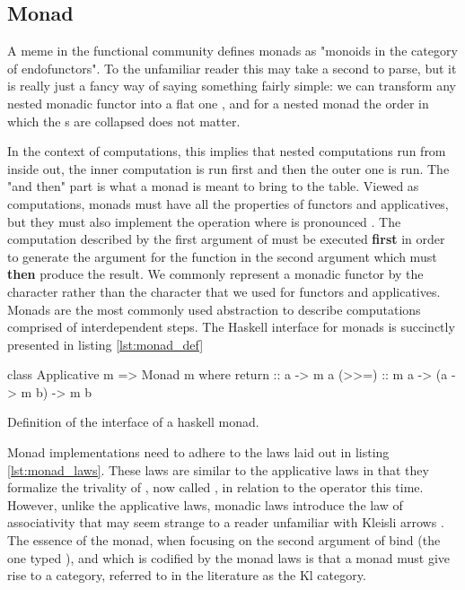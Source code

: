   \subsection{Monad}

  A meme in the functional community defines monads as "monoids in the
  category of endofunctors". To the unfamiliar reader this may take a
  second to parse, but it is really just a fancy way of saying something
  fairly simple: we can transform any nested monadic functor  into a flat one , and for a nested monad  the order in which the s are collapsed does
  not matter.
  
  In the context of computations, this implies that nested
  computations run from inside out, the inner computation is run first
  and then the outer one is run. The "and then" part is what a monad is
  meant to bring to the table. Viewed as computations, monads must have
  all the properties of functors and applicatives, but they must also
  implement the operation  where
  \hask{>>=} is pronounced . The computation described by the
  first argument of \hask{>>=} must be executed \textbf{first} in order
  to generate the argument for the function in the second argument which
  must \textbf{then} produce the result. We commonly represent a monadic
  functor by the character  rather than the character 
  that we used for functors and applicatives. Monads are the most
  commonly used abstraction to describe computations comprised of
  interdependent steps. The Haskell interface for monads is succinctly
  presented in listing \ref{lst:monad_def}

  \begin{code}
\begin{haskellcode}
class Applicative m => Monad m where
  return :: a -> m a
  (>>=) :: m a -> (a -> m b) -> m b
\end{haskellcode}
    \caption{\label{lst:monad_def}Definition of the interface of a
      haskell monad.}
  \end{code}

  Monad implementations need to adhere to the laws laid out in listing
  \ref{lst:monad_laws}. These laws are similar to the applicative laws
  in that they formalize the trivality of , now called
  , in relation to the  operator this
  time. However, unlike the applicative laws, monadic laws introduce the
  law of associativity that may seem strange to a reader unfamiliar with
  Kleisli arrows \cite{dawsonCompoundMonadsKleisli2007}. The essence of
  the monad, when focusing on the second argument of bind (the one typed
  ), and which is codified by the monad laws is that a
  monad  must give rise to a category, referred to in the
  literature as the Kl category.

